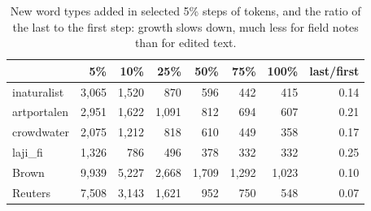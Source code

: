 \begin{table}[htbp]
\centering
\small
\caption{New word types added in selected 5\% steps of tokens, and the ratio of the last to the first step: growth slows down, much less for field notes than for edited text.}
\label{tab:heaps-inc}
\begin{tabular}{lrrrrrrr}
\toprule
 & 5\% & 10\% & 25\% & 50\% & 75\% & 100\% & last/first \\
\midrule
inaturalist & 3{,}065 & 1{,}520 & 870 & 596 & 442 & 415 & 0.14 \\
artportalen & 2{,}951 & 1{,}622 & 1{,}091 & 812 & 694 & 607 & 0.21 \\
crowdwater & 2{,}075 & 1{,}212 & 818 & 610 & 449 & 358 & 0.17 \\
laji\_fi & 1{,}326 & 786 & 496 & 378 & 332 & 332 & 0.25 \\
Brown & 9{,}939 & 5{,}227 & 2{,}668 & 1{,}709 & 1{,}292 & 1{,}023 & 0.10 \\
Reuters & 7{,}508 & 3{,}143 & 1{,}621 & 952 & 750 & 548 & 0.07 \\
\bottomrule
\end{tabular}
\end{table}
